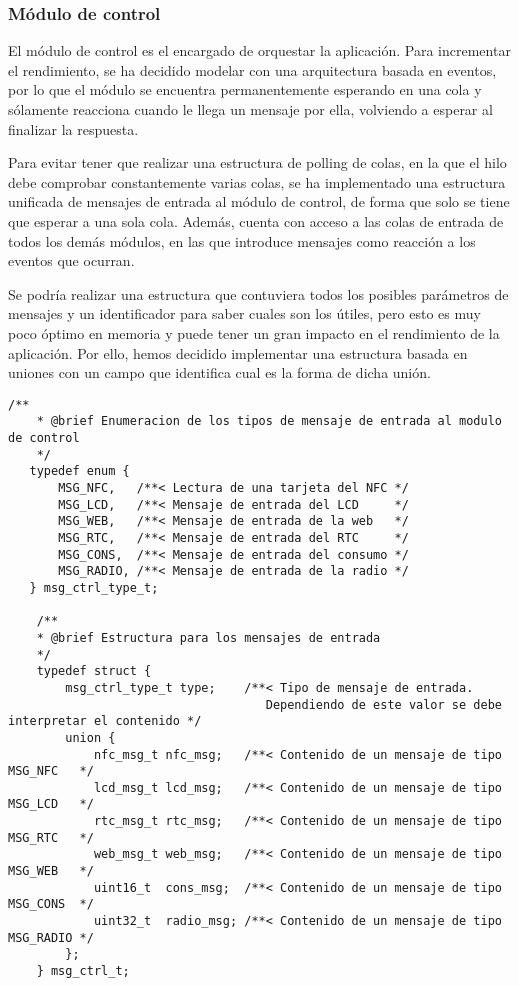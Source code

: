\subsubsection{Módulo de control}
\label{subsubsec:modulo-control}

El módulo de control es el encargado de orquestar la aplicación. Para incrementar el rendimiento, se ha decidido modelar con una arquitectura basada en eventos, por lo que el módulo se encuentra permanentemente esperando en una cola y sólamente reacciona cuando le llega un mensaje por ella, volviendo a esperar al finalizar la respuesta.

Para evitar tener que realizar una estructura de polling de colas, en la que el hilo debe comprobar constantemente varias colas, se ha implementado una estructura unificada de mensajes de entrada al módulo de control, de forma que solo se tiene que esperar a una sola cola. Además, cuenta con acceso a las colas de entrada de todos los demás módulos, en las que introduce mensajes como reacción a los eventos que ocurran.

Se podría realizar una estructura que contuviera todos los posibles parámetros de mensajes y un identificador para saber cuales son los útiles, pero esto es muy poco óptimo en memoria y puede tener un gran impacto en el rendimiento de la aplicación. Por ello, hemos decidido implementar una estructura basada en uniones con un campo que identifica cual es la forma de dicha unión. 

\begin{lstlisting}[captionpos=t, caption={Estructura para los mensajes al control}]
    /**
    * @brief Enumeracion de los tipos de mensaje de entrada al modulo de control
    */
   typedef enum {
       MSG_NFC,   /**< Lectura de una tarjeta del NFC */
       MSG_LCD,   /**< Mensaje de entrada del LCD     */
       MSG_WEB,   /**< Mensaje de entrada de la web   */
       MSG_RTC,   /**< Mensaje de entrada del RTC     */
       MSG_CONS,  /**< Mensaje de entrada del consumo */
       MSG_RADIO, /**< Mensaje de entrada de la radio */
   } msg_ctrl_type_t;

    /**
    * @brief Estructura para los mensajes de entrada
    */
    typedef struct {
        msg_ctrl_type_t type;    /**< Tipo de mensaje de entrada. 
                                    Dependiendo de este valor se debe interpretar el contenido */
        union {
            nfc_msg_t nfc_msg;   /**< Contenido de un mensaje de tipo MSG_NFC   */
            lcd_msg_t lcd_msg;   /**< Contenido de un mensaje de tipo MSG_LCD   */
            rtc_msg_t rtc_msg;   /**< Contenido de un mensaje de tipo MSG_RTC   */
            web_msg_t web_msg;   /**< Contenido de un mensaje de tipo MSG_WEB   */
            uint16_t  cons_msg;  /**< Contenido de un mensaje de tipo MSG_CONS  */
            uint32_t  radio_msg; /**< Contenido de un mensaje de tipo MSG_RADIO */
        };
    } msg_ctrl_t;
\end{lstlisting}

